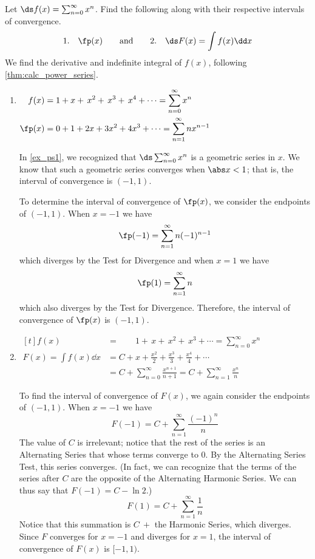 \begin{example}\label{ex_ps3}
Let $\ds f(x) = \sum_{n=0}^\infty x^n$. Find the following along with their respective intervals of convergence.
\[
 \text{1.}\quad\fp(x)
 \qquad\text{and}\qquad
 \text{2.}\quad\ds F(x) =\int f(x)\dd x
\]
\solution
We find the derivative and indefinite integral of $f(x)$, following \autoref{thm:calc_power_series}.

\begin{enumerate}
\item\hfill$\begin{aligned}[t]
f(x)&=1+x+\,x^2+\,x^3+\,x^4+\dotsb = \sum_{n=0}^\infty x^n\\
\fp(x) &= 0+1+2x+3x^2+4x^3+\dotsb=\sum_{n=1}^\infty nx^{n-1} 
\end{aligned}$\hfill\null

In \autoref{ex_ps1}, we recognized that $\ds \sum_{n=0}^\infty x^n$ is a geometric series in $x$. We know that such a geometric series converges when $\abs x<1$; that is, the interval of convergence is $(-1,1)$.

To determine the interval of convergence of $\fp(x)$, we consider the endpoints of $(-1,1)$.
When $x=-1$ we have
\[\fp(-1) = \sum_{n=1}^\infty n(-1)^{n-1}\]
which diverges by the Test for Divergence
and when $x=1$ we have
\[\fp(1) = \sum_{n=1}^\infty n\]
which also diverges by the Test for Divergence. Therefore, the interval of convergence of $\fp(x)$ is $(-1,1)$. 

\item\hfill$\begin{aligned}[t]
 f(x)&=\phantom{C+{}}1+\,x+\,x^2+\,x^3+\dotsb = \sum_{n=0}^\infty x^n\\
 F(x) = \int f(x)\dd x &= C+ x+\frac{x^2}{2}+\frac{x^3}3+\frac{x^4}4+\dotsb \\
 &= C+\sum_{n=0}^\infty \frac{x^{n+1}}{n+1}=C+\sum_{n=1}^\infty \frac{x^{n}}{n}  
\end{aligned}$\hfill\null

To find the interval of convergence of $F(x)$, we again consider the endpoints of $(-1,1)$.
When $x=-1$ we have
\[F(-1) = C+\sum_{n=1}^\infty \frac{(-1)^{n}}{n}\]
The value of $C$ is irrelevant; notice that the rest of the series is an Alternating Series that whose terms converge to 0. By the Alternating Series Test, this series converges. (In fact, we can recognize that the terms of the series after $C$ are the opposite of the Alternating Harmonic Series. We can thus say that $F(-1) = C-\ln 2$.)
\[F(1) = C+\sum_{n=1}^\infty \frac{1}{n} \]
Notice that this summation is $C\ +$ the Harmonic Series, which diverges. Since $F$ converges for $x=-1$ and diverges for $x=1$, the interval of convergence of $F(x)$ is $[-1,1)$.
\end{enumerate}
\end{example}

